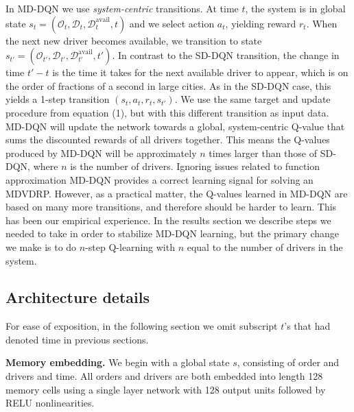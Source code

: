 In MD-DQN we use {\em system-centric} transitions. At time $t$, the system is in global state $s_t = (\mathcal{O}_t, \mathcal{D}_t, \mathcal{D}^{\mathrm{avail}}_t, t)$ and we select action $a_t$, yielding reward $r_t$. When the next new driver becomes available, we transition to state $s_{t'} = (\mathcal{O}_{t'}, \mathcal{D}_{t'}, \mathcal{D}^{\mathrm{avail}}_{t'}, t')$. In contrast to the SD-DQN transition, the change in time $t'-t$ is the time it takes for the next available driver to appear, which is on the order of fractions of a second in large cities. As in the SD-DQN case, this yields a 1-step transition $(s_t, a_t, r_t, s_{t'})$. We use the same target and update procedure from equation (1), but with this different transition as input data. MD-DQN will update the network towards a global, system-centric Q-value that sums the discounted rewards of all drivers together. This means the Q-values produced by MD-DQN will be approximately $n$ times larger than those of SD-DQN, where $n$ is the number of drivers. Ignoring issues related to function approximation MD-DQN provides a correct learning signal for solving an MDVDRP. However, as a practical matter, the Q-values learned in MD-DQN are based on many more transitions, and therefore should be harder to learn. This has been our empirical experience. In the results section we describe steps we needed to take in order to stabilize MD-DQN learning, but the primary change we make is to do $n$-step Q-learning \cite{mnih2016asynchronous} with $n$ equal to the number of drivers in the system.
% 
% 
% 
% 


\subsection{Architecture details}

For ease of exposition, in the following section we omit subscript $t$'s that had denoted time in previous sections.

{\bf Memory embedding.} We begin with a global state $s$, consisting of order and drivers and time. All orders and drivers are both embedded into length 128 memory cells using a single layer network with 128 output units followed by RELU nonlinearities. 

